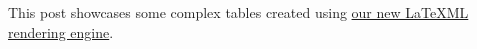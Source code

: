 This post showcases some complex tables created using \href{https://www.authorea.com/users/5713/articles/28015/_show_article}{our new LaTeXML rendering engine}.